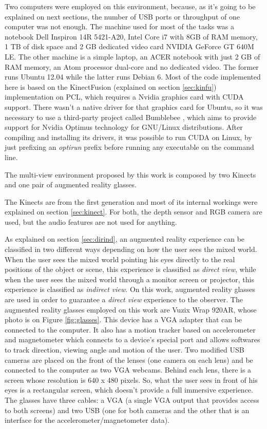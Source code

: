 \documentclass[msc, a4paper, classic, en]{ufbathesis}
\begin{document}
Two computers were employed on this environment, because, as it's going to be explained on next sections, the number of USB ports or throughput of one computer was not enough. The machine used for most of the tasks was a notebook Dell Inspiron 14R 5421-A20, Intel Core i7 with 8GB of RAM memory, 1 TB of disk space and 2 GB dedicated video card NVIDIA GeForce GT 640M LE. The other machine is a simple laptop, an ACER notebook with just 2 GB of RAM memory, an Atom processor dual-core and no dedicated video. The former runs Ubuntu 12.04 while the latter runs Debian 6. Most of the code implemented here is based on the KinectFusion (explained on section \ref{sec:kinfu}) implementation on PCL, which requires a Nvidia graphics card with CUDA support. There wasn't a native driver for that graphics card for Ubuntu, so it was necessary to use a third-party project called Bumblebee \cite{bumblebee}, which aims to provide support for Nvidia Optimus technology for GNU/Linux distributions. After compiling and installing its drivers, it was possible to run CUDA on Linux, by just prefixing an \textit{optirun} prefix before running any executable on the command line.

The multi-view environment proposed by this work is composed by two Kinects and one pair of augmented reality glasses.

The Kinects are from the first generation and most of its internal workings were explained on section \ref{sec:kinect}. For both, the depth sensor and RGB camera are used, but the audio features are not used for anything.

As explained on section \ref{sec:dirind}, an augmented reality experience can be classified in two different ways depending on how the user sees the mixed world. When the user sees the mixed world pointing his eyes directly to the real positions of the object or scene, this experience is classified as \textit{direct view}, while when the user sees the mixed world through a monitor screen or projector, this experience is classified as \textit{indirect view}. On this work, augmented reality glasses are used in order to guarantee a \textit{direct view} experience to the observer. The augmented reality glasses employed on this work are Vuzix Wrap 920AR, whose photo is on Figure \ref{fig:glasses}. This device has a VGA adapter that can be connected to the computer. It also has a motion tracker based on accelerometer and magnetometer which connects to a device's special port and allows softwares to track direction, viewing angle and motion of the user. Two modified USB cameras are placed on the front of the lenses (one camera on each lens) and be connected to the computer as two VGA webcams. Behind each lens, there is a screen whose resolution is 640 x 480 pixels. So, what the user sees in front of his eyes is a rectangular screen, which doesn't provide a full immersive experience. The glasses have three cables: a VGA (a single VGA output that provides access to both screens) and two USB (one for both cameras and the other that is an interface for the accelerometer/magnetometer data).
\end{document}
